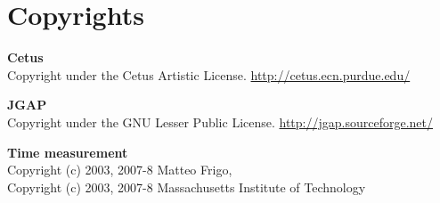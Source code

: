 \chapter*{Copyrights}


\textbf{Cetus}\\
Copyright under the Cetus Artistic License. \url{http://cetus.ecn.purdue.edu/}

\medskip

\noindent \textbf{JGAP}\\
Copyright under the GNU Lesser Public License.
\url{http://jgap.sourceforge.net/}

\medskip

\noindent \textbf{Time measurement}\\
Copyright (c) 2003, 2007-8 Matteo Frigo,\\
Copyright (c) 2003, 2007-8 Massachusetts Institute of Technology

